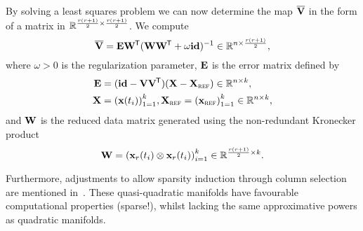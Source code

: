 By solving a least squares problem we can now determine the map $\overline{\mathbf{V}}$ in the form of a matrix in $\mathbb{R}^{\frac{r (r + 1)}{2} \times \frac{r (r + 1)}{2}}$.
We compute
\begin{equation}
    \overline{\mathbf{V}} = \mathbf{E} \mathbf{W}^{\mkern-1.5mu \mathsf{T}} (\mathbf{W} \mathbf{W}^{\mkern-1.5mu \mathsf{T}} + \omega \mathbf{id})^{-1} \in \mathbb{R}^{n \times \frac{r (r + 1)}{2}},
\end{equation}
where $\omega > 0$ is the regularization parameter, $\mathbf{E}$ is the error matrix defined by
\begin{align*}
	\mathbf{E} &= (\mathbf{id} - \mathbf{V} \mathbf{V}^{\mkern-1.5mu \mathsf{T}})(\mathbf{X} - \mathbf{X}_{\textsc{ref}}) \in \mathbb{R}^{n \times k}, \\
    \mathbf{X} &= {\left( \mathbf{x}(t_i) \right)}_{1 = 1}^k, \mathbf{X}_\textsc{ref} = {\left( \mathbf{x}_\textsc{ref} \right)}_{1 = 1}^k \in \mathbb{R}^{n \times k},
\end{align*}
and $\mathbf{W}$ is the reduced data matrix generated using the non-redundant Kronecker product
\[
    \mathbf{W} = {\left( \mathbf{x}_r(t_i) \otimes \mathbf{x}_r(t_i) \right)}_{i = 1}^k \in \mathbb{R}^{\frac{r (r + 1)}{2} \times k}.
\]

Furthermore, adjustments to allow sparsity induction through column selection are mentioned in~\cite[Section~2.3]{Geelen2023}.
These quasi-quadratic manifolds have favourable computational properties (sparse!), whilst lacking the same approximative powers as quadratic manifolds.

